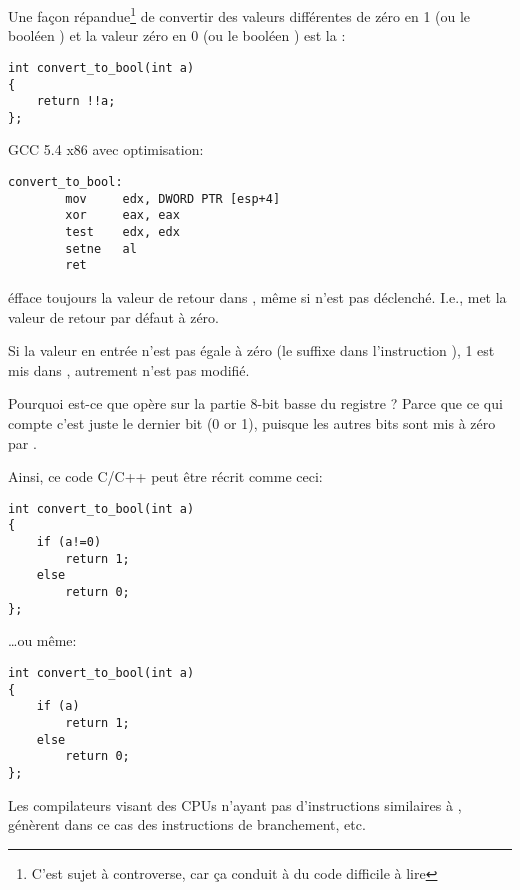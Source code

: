 
Une façon répandue\footnote{C'est sujet à controverse, car ça conduit à du code difficile
à lire} de convertir des valeurs différentes de zéro en 1 (ou le booléen )
et la valeur zéro en 0 (ou le booléen ) est la :

\begin{lstlisting}[style=customc]
int convert_to_bool(int a)
{
	return !!a;
};
\end{lstlisting}

GCC 5.4 x86 avec optimisation:

\begin{lstlisting}[style=customasmx86]
convert_to_bool:
        mov     edx, DWORD PTR [esp+4]
        xor     eax, eax
        test    edx, edx
        setne   al
        ret
\end{lstlisting}

 éfface toujours la valeur de retour dans \EAX, même si  n'est
pas déclenché. I.e.,  met la valeur de retour par défaut à zéro.

Si la valeur en entrée n'est pas égale à zéro (le suffixe  dans l'instruction
), 1 est mis dans \AL, autrement \AL n'est pas modifié.

Pourquoi est-ce que  opère sur la partie 8-bit basse du registre \EAX?
Parce que ce qui compte c'est juste le dernier bit (0 or 1), puisque les autres bits
sont mis à zéro par .

Ainsi, ce code C/C++ peut être récrit comme ceci:

\begin{lstlisting}[style=customc]
int convert_to_bool(int a)
{
	if (a!=0)
		return 1;
	else
		return 0;
};
\end{lstlisting}

\dots ou même:

\begin{lstlisting}[style=customc]
int convert_to_bool(int a)
{
	if (a)
		return 1;
	else
		return 0;
};
\end{lstlisting}

Les compilateurs visant des \ac{CPU}s n'ayant pas d'instructions similaires à ,
génèrent dans ce cas des instructions de branchement, etc.
